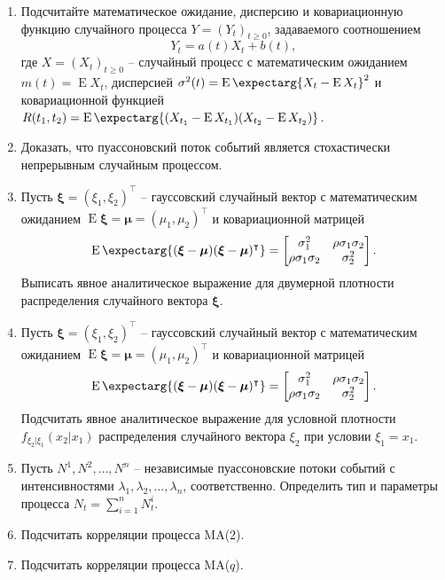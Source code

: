 \documentclass[a4paper,12pt]{extreport}
\renewcommand{\=}[1]{\stackrel{#1}{=}} %
\newcommand{\Expect}{\mathop{{}\mathrm{E}}}
\newcommand{\Expectmore}{\operatorname{E}\expectarg}
\newcommand{\generaltime}{t \geqslant 0}
\newcommand{\newprocess}[1]{
	\ensuremath{
		#1 = \left(#1 _t\right)_{\generaltime}
	}
}
\begin{document}
\begin{enumerate}
	\item Подсчитайте математическое ожидание, дисперсию
	и ковариационную функцию случайного процесса
	$\newprocess{Y}$, задаваемого соотношением
	\[
	Y_t = a(t) X_t + b(t),
	\]
	где $\newprocess{X}$ -- случайный процесс с математическим ожиданием 
	$m(t) = \Expect X_t$, дисперсией $\sigma^2(t) = \Expectmore{X_t - \Expect X_t}^2$
	и ковариационной функцией $R(t_1, t_2) = 
	\Expectmore{(X_{t_1} - \Expect X_{t_1})(X_{t_2} - \Expect X_{t_2})}$.

	\item Доказать, что пуассоновский поток событий является стохастически 
	непрерывным случайным процессом.

	\item Пусть $\bm{\xi} = (\xi_1, \xi_2)^{\intercal}$ -- гауссовский случайный вектор
	с математическим ожиданием $\Expect \bm{\xi} = \bm{\mu} = (\mu_1, \mu_2)^{\intercal}$
	и ковариационной матрицей 
	\[
	\Expectmore{(\bm{\xi} - \bm{\mu})(\bm{\xi} - \bm{\mu})^{\intercal}} = 
	  \begin{bmatrix}
	    \sigma_1^2 & \rho \sigma_1 \sigma_2\\
	    \rho \sigma_1 \sigma_2 & \sigma_2^2
	  \end{bmatrix}.
	\]
	Выписать явное аналитическое выражение для двумерной плотности
	распределения случайного вектора $\bm{\xi}$.

	\item Пусть $\bm{\xi} = (\xi_1, \xi_2)^{\intercal}$ -- гауссовский случайный вектор
	с математическим ожиданием $\Expect \bm{\xi} = \bm{\mu} = (\mu_1, \mu_2)^{\intercal}$
	и ковариационной матрицей 
	\[
	\Expectmore{(\bm{\xi} - \bm{\mu})(\bm{\xi} - \bm{\mu})^{\intercal}} = 
	  \begin{bmatrix}
	    \sigma_1^2 & \rho \sigma_1 \sigma_2\\
	    \rho \sigma_1 \sigma_2 & \sigma_2^2
	  \end{bmatrix}.
	\]
	Подсчитать явное аналитическое выражение для условной плотности
	$f_{\xi_2|\xi_1}(x_2 | x_1)$
	распределения случайного вектора $\xi_2$ при условии $\xi_1 = x_1$.

	\item Пусть $N^1, N^2, \ldots, N^n$ -- независимые пуассоновские потоки событий
	с интенсивностями $\lambda_1, \lambda_2, \ldots, \lambda_n$, соответственно.
	Определить тип и параметры процесса $N_t = \sum\limits_{i=1}^n N^i_t$.


	\item Подсчитать корреляции процесса MA(2). 
	\item Подсчитать корреляции процесса MA($q$). 


\end{enumerate}
\end{document}
